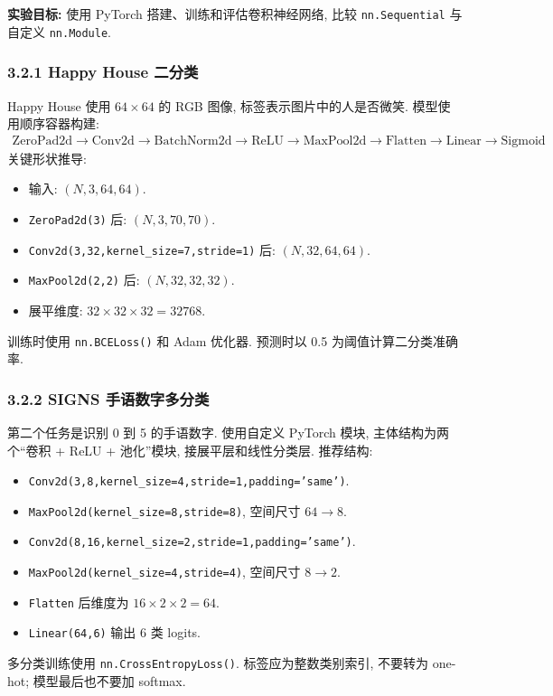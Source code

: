 \documentclass{../../nndlcourse}
\begin{document}
\textbf{实验目标: }使用 PyTorch 搭建、训练和评估卷积神经网络, 比较 \texttt{nn.Sequential} 与自定义 \texttt{nn.Module}.

\subsubsection*{3.2.1 Happy House 二分类}

Happy House 使用 $64\times64$ 的 RGB 图像, 标签表示图片中的人是否微笑.
模型使用顺序容器构建:
\begin{align}
    \mathrm{ZeroPad2d}\to \mathrm{Conv2d}\to \mathrm{BatchNorm2d}\to
    \mathrm{ReLU}\to \mathrm{MaxPool2d}\to \mathrm{Flatten}\to
    \mathrm{Linear}\to \mathrm{Sigmoid}
\end{align}
关键形状推导:
\begin{itemize}
    \item 输入: $(N,3,64,64)$.
    \item \texttt{ZeroPad2d(3)} 后: $(N,3,70,70)$.
    \item \texttt{Conv2d(3,32,kernel\_size=7,stride=1)} 后: $(N,32,64,64)$.
    \item \texttt{MaxPool2d(2,2)} 后: $(N,32,32,32)$.
    \item 展平维度: $32\times32\times32=32768$.
\end{itemize}
训练时使用 \texttt{nn.BCELoss()} 和 Adam 优化器. 预测时以 0.5 为阈值计算二分类准确率.

\subsubsection*{3.2.2 SIGNS 手语数字多分类}

第二个任务是识别 0 到 5 的手语数字. 使用自定义 PyTorch 模块, 主体结构为两个``卷积 + ReLU + 池化''模块, 接展平层和线性分类层.
推荐结构:
\begin{itemize}
    \item \texttt{Conv2d(3,8,kernel\_size=4,stride=1,padding='same')}.
    \item \texttt{MaxPool2d(kernel\_size=8,stride=8)}, 空间尺寸 $64\to8$.
    \item \texttt{Conv2d(8,16,kernel\_size=2,stride=1,padding='same')}.
    \item \texttt{MaxPool2d(kernel\_size=4,stride=4)}, 空间尺寸 $8\to2$.
    \item \texttt{Flatten} 后维度为 $16\times2\times2=64$.
    \item \texttt{Linear(64,6)} 输出 6 类 logits.
\end{itemize}
多分类训练使用 \texttt{nn.CrossEntropyLoss()}. 标签应为整数类别索引, 不要转为 one-hot; 模型最后也不要加 softmax.
\end{document}
